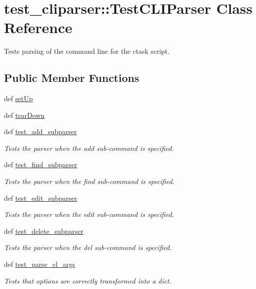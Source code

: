 \hypertarget{classtest__cliparser_1_1TestCLIParser}{
\section{test\-\_\-cliparser\-:\-:\-Test\-C\-L\-I\-Parser \-Class \-Reference}
\label{classtest__cliparser_1_1TestCLIParser}
}


\-Tests parsing of the command line for the ctask script.  


\subsection*{\-Public \-Member \-Functions}
\begin{DoxyCompactItemize}
\item 
def \hyperlink{classtest__cliparser_1_1TestCLIParser_a47dc263dd64bab7a15dfb3831045750f}{set\-Up}
\item 
def \hyperlink{classtest__cliparser_1_1TestCLIParser_ac0f79f6c89eb75b7b2cbe94818d4fe7e}{tear\-Down}
\item 
def \hyperlink{classtest__cliparser_1_1TestCLIParser_a8d79f8705a694d09bfd1f8d705c6d894}{test\-\_\-add\-\_\-subparser}
\begin{DoxyCompactList}\small\item\em \-Tests the parser when the add sub-\/command is specified. \end{DoxyCompactList}\item 
def \hyperlink{classtest__cliparser_1_1TestCLIParser_a207d3eb4b33f672bc28b82ce6175717c}{test\-\_\-find\-\_\-subparser}
\begin{DoxyCompactList}\small\item\em \-Tests the parser when the find sub-\/command is specified. \end{DoxyCompactList}\item 
def \hyperlink{classtest__cliparser_1_1TestCLIParser_a92d6755cbd93c3fe79eabca76a765355}{test\-\_\-edit\-\_\-subparser}
\begin{DoxyCompactList}\small\item\em \-Tests the parser when the edit sub-\/command is specified. \end{DoxyCompactList}\item 
def \hyperlink{classtest__cliparser_1_1TestCLIParser_ad0b984e9efe144518a5a9607e683bb42}{test\-\_\-delete\-\_\-subparser}
\begin{DoxyCompactList}\small\item\em \-Tests the parser when the del sub-\/command is specified. \end{DoxyCompactList}\item 
def \hyperlink{classtest__cliparser_1_1TestCLIParser_adc7051f51315f1a629b59b06a3dc7a0e}{test\-\_\-parse\-\_\-cl\-\_\-args}
\begin{DoxyCompactList}\small\item\em \-Tests that options are correctly transformed into a dict. \end{DoxyCompactList}\end{DoxyCompactItemize}
